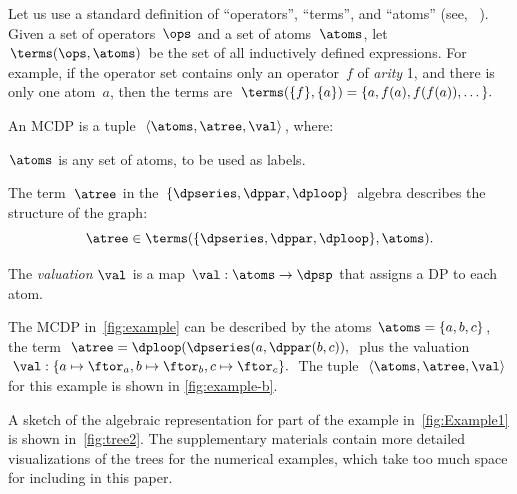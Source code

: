 Let us use a standard definition of ``operators'', ``terms'',
and ``atoms'' (see, \eg~\cite[p.41]{jezek08}). Given a set
of operators~$\ops$ and a set of atoms~$\atoms$, let~$\terms(\ops,\atoms)$
be the set of all inductively defined expressions. For example, if
the operator set contains only an operator~$f$ of \emph{arity} 1,
and there is only one atom~$a$, then the terms are $\terms(\{f\},\{a\})=\{a,f(a),f(f(a)),\dots\}.$



\begin{definition}
    \label{def:MCDP-algebraic}An MCDP is a tuple~$\left\langle \atoms,\atree,\val\right\rangle $,
    where:
    \begin{compactenum}
        \item $\atoms$ is any set of atoms, to be used as labels.
        \item The term~$\atree$ in the $\{\dpseries,\dppar,\dploop\}$ algebra
        describes the structure of the graph:
        \[
            \atree\in\terms(\{\dpseries,\dppar,\dploop\},\atoms).
        \]
        \item The \emph{valuation} $\val$ is a map $\val:\atoms\rightarrow\dpsp$
        that assigns a DP to each atom.
    \end{compactenum}
\end{definition}
\begin{example}
    The MCDP in~\cref{fig:example} can be described by the atoms
    $\atoms=\{a,b,c\}$, the term $\atree=\dploop(\dpseries(a,\dppar(b,c)),$
    plus the valuation $\val:\{a\mapsto\ftor_{a},b\mapsto\ftor_{b},c\mapsto\ftor_{c}\}.$
    The tuple~$\left\langle \atoms,\atree,\val\right\rangle $ for this
    example is shown in \cref{fig:example-b}.
\end{example}
\begin{example}
    A sketch of the algebraic representation for part of the example in~\cref{fig:Example1}
    is shown in~\cref{fig:tree2}. The supplementary materials contain
    more detailed visualizations of the trees for the numerical examples,
    which take too much space for including in this paper.
\end{example}
